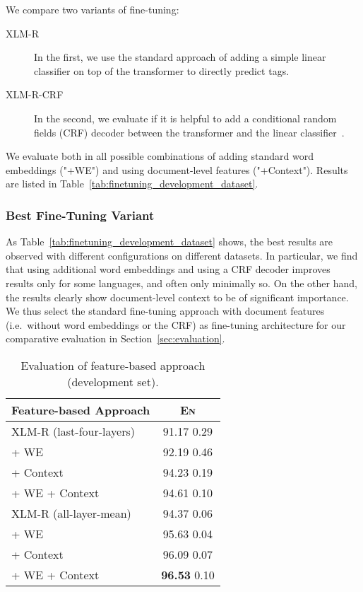 \documentclass[11pt,a4paper]{article}
\begin{document}
We compare two variants of fine-tuning: 

\begin{description}
\item[XLM-R] In the first, we use the standard approach of adding a simple linear classifier on top of the transformer to directly predict tags. 
\item[XLM-R-CRF] In the second, we evaluate if it is helpful to add a conditional random fields (CRF) decoder between the transformer and the linear classifier~\cite{souza2019portuguese}. 
\end{description}

\noindent
We evaluate both in all possible combinations of adding standard word embeddings ("+WE") and using document-level features ("+Context"). Results are listed in Table~\ref{tab:finetuning_development_dataset}.


\subsubsection{Best Fine-Tuning Variant}

As Table~\ref{tab:finetuning_development_dataset} shows, the best results are observed with different configurations on different datasets. In particular, we find that using additional word embeddings and using a CRF decoder improves results only for some languages, and often only minimally so. On the other hand, the results clearly show document-level context to be of significant importance. We thus select the standard fine-tuning approach with document features (i.e.~without word embeddings or the CRF) as fine-tuning architecture for our comparative evaluation in Section~\ref{sec:evaluation}.









\begin{table}
\centering
\begin{tabular}{lc}
\hline
 Feature-based Approach             & \textsc{En}                \\ \hline \textsc{XLM-R} (last-four-layers)  & 91.17  0.29           \\        + WE                               & 92.19  0.46           \\        + Context                          & 94.23  0.19           \\        + WE + Context                     & 94.61  0.10           \\ \hline \textsc{XLM-R} (all-layer-mean)    & 94.37  0.06           \\        + WE                               & 95.63  0.04           \\        + Context                          & 96.09  0.07           \\        + WE + Context                     & \textbf{96.53}  0.10  \\ \hline \end{tabular}\caption{Evaluation of feature-based approach (development set).}
\label{tab:feature_based_development_dataset}
\end{table}
\end{document}
